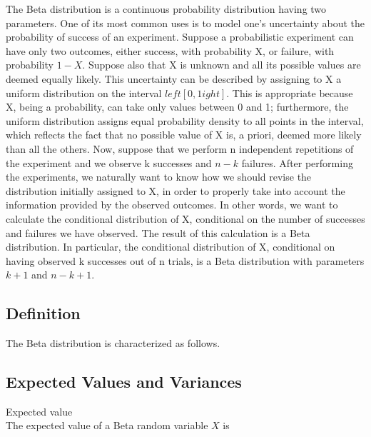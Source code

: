 
The Beta distribution is a continuous probability distribution having two parameters. One of its most common uses is to model one's uncertainty about the probability of success of an experiment.
Suppose a probabilistic experiment can have only two outcomes, either success, with probability  X, or failure, with probability  $1-X$. Suppose also that  X is unknown and all its possible values are deemed equally likely. This uncertainty can be described by assigning to  X a uniform distribution on the interval  $left[ 0,1
ight] $. This is appropriate because  X, being a probability, can take only values between  0 and  1; furthermore, the uniform distribution assigns equal probability density to all points in the interval, which reflects the fact that no possible value of  X is, a priori, deemed more likely than all the others. Now, suppose that we perform  n independent repetitions of the experiment and we observe  k successes and  $n-k$ failures. After performing the experiments, we naturally want to know how we should revise the distribution initially assigned to  X, in order to properly take into account the information provided by the observed outcomes. In other words, we want to calculate the conditional distribution of  X, conditional on the number of successes and failures we have observed. The result of this calculation is a Beta distribution. In particular, the conditional distribution of  X, conditional on having observed  k successes out of  n trials, is a Beta distribution with parameters  $k+1$ and  $n-k+1$.

\subsection{Definition}
The Beta distribution is characterized as follows.


\subsection{Expected Values and Variances}

\item Expected value\\
The expected value of a Beta random variable $X$ is

